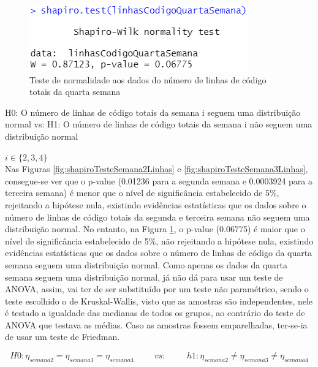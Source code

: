 \documentclass[%
 aip,
cp,  %
 amsmath,amssymb,%
 reprint,%
]{revtex4-2}
\begin{document}
 \begin{figure}[!h]
     \centering
     \includegraphics[width=0.6\linewidth]{imagens//questao2/testeShapiroLinhasQuartaSemana.png}
     \caption{Teste de normalidade aos dados do número de linhas de código totais da quarta semana}
     \label{fig:shapiroTesteSemana4Linhas}
 \end{figure}


\begin{center}
    H0: O número de linhas de código totais da semana i seguem uma distribuição normal
    \newline
    vs:
    \newline
    H1: O número de linhas de código totais da semana i não seguem uma distribuição normal
    
\end{center}
$i \in \{2, 3, 4\}$ \\


 Nas Figuras \ref{fig:shapiroTesteSemana2Linhas} e \ref{fig:shapiroTesteSemana3Linhas}, consegue-se ver que o p-value (0.01236 para a segunda semana e 0.0003924 para a terceira semana) é menor que o nível de significância estabelecido de 5\%, rejeitando a hipótese nula, existindo evidências estatísticas que os dados sobre o número de linhas de código totais da segunda e terceira semana não seguem uma distribuição normal. No entanto, na Figura \ref{fig:shapiroTesteSemana4Linhas}, o p-value (0.06775) é maior que o nível de significância estabelecido de 5\%, não rejeitando a hipótese nula, existindo evidências estatísticas que os dados sobre o número de linhas de código da quarta semana seguem uma distribuição normal.
 Como apenas os dados da quarta semana seguem uma distribuição normal, já não dá para usar um teste de ANOVA, assim, vai ter de ser substituído por um teste não paramétrico, sendo o teste escolhido o de Kruskal-Wallis, visto que as amostras são independentes, nele é testado a igualdade das medianas de todos os grupos, ao contrário do teste de ANOVA que testava as médias. Caso as amostras fossem emparelhadas, ter-se-ia de usar um teste de Friedman.

\[ H0: {\eta}_{semana2} = {\eta}_{semana3} = {\eta}_{semana4}  \hspace{1cm} vs: \hspace{1cm} h1: {\eta}_{semana2} \ne {\eta}_{semana3} \ne {\eta}_{semana4} \]
\end{document}
